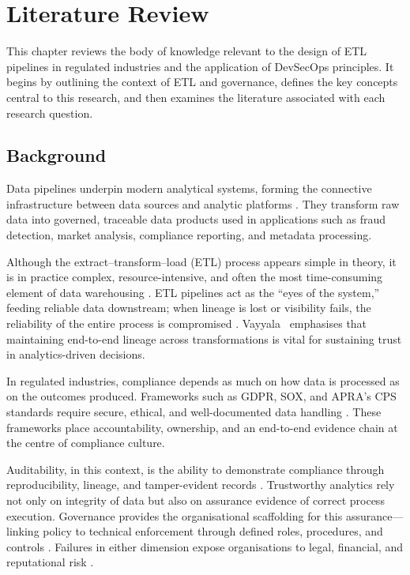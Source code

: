\chapter{Literature Review}

This chapter reviews the body of knowledge relevant to the design of ETL
pipelines in regulated industries and the application of DevSecOps principles.
It begins by outlining the context of ETL and governance, defines the key
concepts central to this research, and then examines the literature associated
with each research question.

\section{Background}
\noindent
Data pipelines underpin modern analytical systems, forming the connective
infrastructure between data sources and analytic platforms
\cite{elbaghazaoui_integrating_2025}. They transform raw data into governed,
traceable data products used in applications such as fraud detection, market
analysis, compliance reporting, and metadata processing.

Although the extract–transform–load (ETL) process appears simple in theory, it
is in practice complex, resource-intensive, and often the most time-consuming
element of data warehousing \cite{kimball_data_2004}. ETL pipelines act as the
“eyes of the system,” feeding reliable data downstream; when lineage is lost or
visibility fails, the reliability of the entire process is compromised
\cite{elbaghazaoui_data_2025-1}. Vayyala~\cite{elbaghazaoui_data_2025-1}
emphasises that maintaining end-to-end lineage across transformations is vital
for sustaining trust in analytics-driven decisions.

In regulated industries, compliance depends as much on how data is processed as
on the outcomes produced. Frameworks such as GDPR, SOX, and APRA’s CPS standards
require secure, ethical, and well-documented data handling
\cite{elbaghazaoui_data_2025,cps230,cps510,cps234,australian_prudential_regulation_authority_prudential_2013}.
These frameworks place accountability, ownership, and an end-to-end evidence
chain at the centre of compliance culture.

Auditability, in this context, is the ability to demonstrate compliance through
reproducibility, lineage, and tamper-evident records
\cite{elbaghazaoui_ensuring_2025}. Trustworthy analytics rely not only on
integrity of data but also on assurance evidence of correct process execution.
Governance provides the organisational scaffolding for this assurance—linking
policy to technical enforcement through defined roles, procedures, and controls
\cite{elbaghazaoui_data_2025, elbaghazaoui_ensuring_2025}. Failures in either
dimension expose organisations to legal, financial, and reputational risk
\cite{elbaghazaoui_data_2025}.

